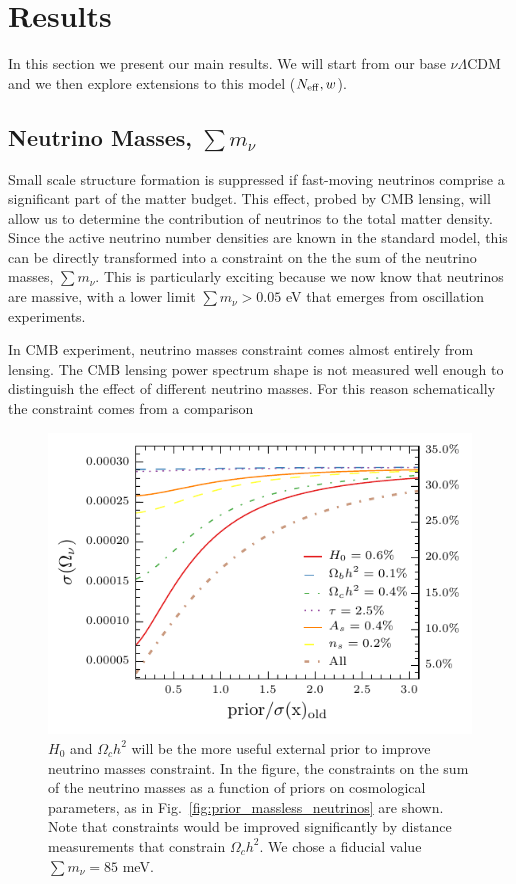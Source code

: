 \documentclass[aps,prd,reprint,superscriptaddress]{revtex4-1}
\newcommand{\reffig}[1]{Fig.~\ref{fig:#1}}
\begin{document}
\section{Results \label{sec:results}}
In this section we present our main results. We will start from our base $\nu \Lambda$CDM and we then explore extensions to this model ($N_{\rm eff},w$).

\subsection{Neutrino Masses, $\sum m_\nu$}

Small scale structure formation is suppressed if fast-moving neutrinos comprise a significant part of the matter budget. This effect, probed by CMB lensing, will allow us to determine the contribution of neutrinos to the total matter density. Since the active neutrino number densities are known in the standard model, this can be directly transformed into a constraint on the the sum of the neutrino masses, $\sum m_\nu$. This is particularly exciting because we now know that neutrinos are massive, with a lower limit  $\sum m_\nu>0.05$ eV that emerges from oscillation experiments. 

In CMB experiment, neutrino masses constraint comes almost entirely from lensing. The CMB lensing power spectrum shape is not measured well enough to distinguish the effect of different neutrino masses. For this reason schematically the constraint comes from a comparison 

\begin{figure}[htbp]
\begin{center}
\includegraphics{prior_omnuh2_snow_mass_lmin=4_lmax=4499.pdf}
\caption{$H_{0}$ and $\Omega_{c}h^{2}$ will be the more useful external prior to improve neutrino masses constraint.
In the figure, the constraints on the sum of the neutrino masses as a function of priors on cosmological parameters, as in \reffig{prior_massless_neutrinos} are shown.  Note that constraints would be improved significantly  by distance measurements that constrain $\Omega_ch^2$. We chose a fiducial value $\sum m_{\nu}=85 $ meV.}
\label{fig:prior_omeganuh2}
\end{center}
\end{figure}
\end{document}
